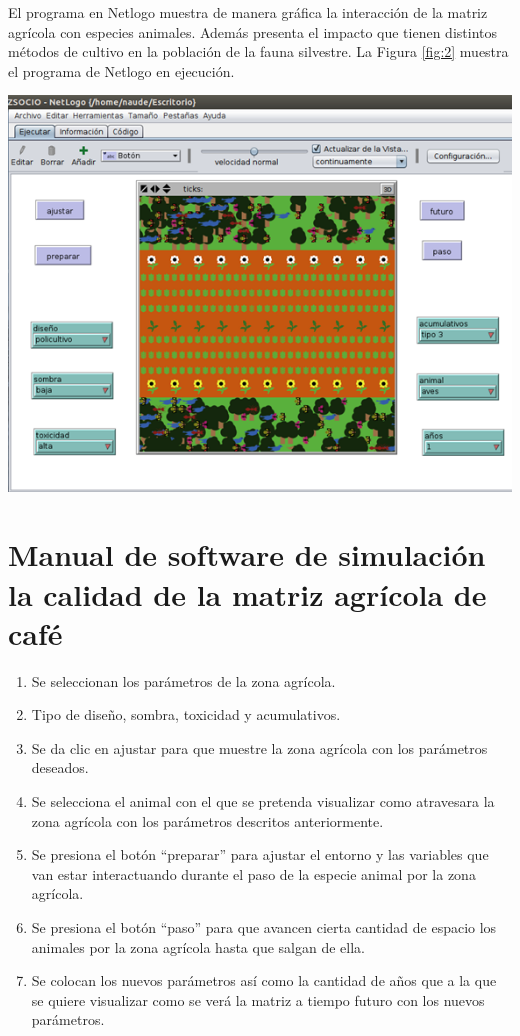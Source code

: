 El programa en Netlogo muestra de manera gráfica la interacción de la matriz agrícola con especies animales. Además presenta el impacto que tienen distintos métodos de cultivo en la población de la fauna silvestre. La Figura \ref{fig:2} muestra el programa de Netlogo en ejecución.

\begin{center}
\includegraphics[scale=0.45]{imagenes/4-agricola/2.PNG}
\label{fig:2}
\end{center}

\section{Manual de software de simulación la calidad de la matriz agrícola de café}
\begin{enumerate}
\item Se seleccionan los parámetros de la zona agrícola.

\item Tipo de diseño, sombra, toxicidad y acumulativos.

\item Se da clic en ajustar para que muestre la zona agrícola con los parámetros deseados.

\item Se selecciona el animal con el que se pretenda visualizar como atravesara la zona agrícola con los parámetros descritos anteriormente.

\item Se presiona el botón ``preparar'' para ajustar el entorno y las variables que van estar interactuando durante el paso de la especie animal por la zona agrícola.

\item Se presiona el botón ``paso'' para que avancen cierta cantidad de espacio los animales por la zona agrícola hasta que salgan de ella.

\item Se colocan los nuevos parámetros así como la cantidad de años que a la que se quiere visualizar como se verá la matriz a tiempo futuro con los nuevos parámetros.
\end{enumerate}

